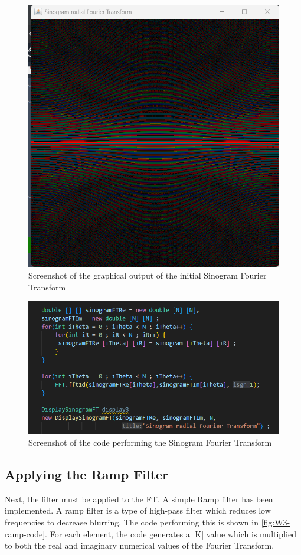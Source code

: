 \begin{figure}[H] 
    \centering
    \includegraphics[width=0.9\columnwidth]{Figures/Week 3/initial-FFTpng.png}
    \caption{Screenshot of the graphical output of the initial Sinogram Fourier Transform}
    \label{fig:W3-initial-FT}
\end{figure}
\begin{figure}[H] 
    \centering
    \includegraphics[width=0.49\columnwidth]{Figures/Week 3/initial-FFT-code.png}
    \caption{Screenshot of the code performing the Sinogram Fourier Transform}
    \label{fig:W3-initial-FT-code}
\end{figure}




\subsection{Applying the Ramp Filter}
Next, the filter must be applied to the FT. A simple Ramp filter has been implemented. A ramp filter is a type of high-pass filter which reduces low frequencies to decrease blurring. The code performing this is shown in \autoref{fig:W3-ramp-code}. For each element, the code generates a |K| value which is multiplied to both the real and imaginary numerical values of the Fourier Transform.

